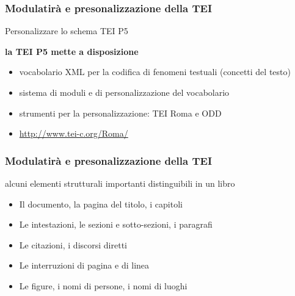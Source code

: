     \begin{frame}
        \frametitle{Modulatirà e presonalizzazione della TEI}
        \addtocounter{nframe}{1}
        
    
        \begin{block}{Personalizzare lo schema TEI P5}
            
            \textbf{la TEI P5 mette a disposizione}
                \begin{itemize}
                    \item vocabolario XML per la codifica di fenomeni testuali (concetti del testo)
                    \item sistema di moduli e di personalizzazione del vocabolario
                    \item strumenti per la personalizzazione: TEI Roma e ODD
                    \item [] \url{http://www.tei-c.org/Roma/}
                \end{itemize} 
        \end{block}
        
    \end{frame}

    \begin{frame}
        \frametitle{Modulatirà e presonalizzazione della TEI}
        \addtocounter{nframe}{1}

        \begin{block}{alcuni elementi strutturali importanti distinguibili in un libro}
                \begin{itemize}
                    \item Il documento, la pagina del titolo, i capitoli
                    \item Le intestazioni, le sezioni e sotto-sezioni, i paragrafi
                    \item Le citazioni, i discorsi diretti
                    \item Le interruzioni di pagina e di linea
                    \item Le figure, i nomi di persone, i nomi di luoghi
                \end{itemize} 
        \end{block}
        
    \end{frame}


